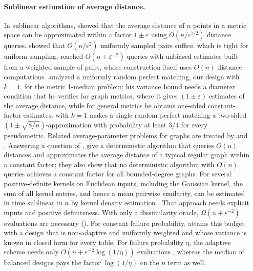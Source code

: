 \paragraph{Sublinear estimation of average distance.}
In sublinear algorithms, \citet{indyk1999sublinear} showed that the average
distance of $n$ points in a metric space can be approximated within a factor $1\pm\varepsilon$
using $O(n/\varepsilon^{7/2})$ distance queries.
\citet{barhum2007approximating} showed that $O(n/\varepsilon^2)$ uniformly
sampled pairs suffice, which is tight for uniform sampling.
\citet{chechik2015average} reached $O(n+\varepsilon^{-2})$ queries with unbiased
estimates built from a weighted sample of pairs, whose construction itself uses
$O(n)$ distance computations. \citet{chang2017metric} analyzed a uniformly
random perfect matching, our design with $k=1$, for the metric 1-median
problem; his variance bound needs a diameter condition
\citep[see also][]{chang2022random} that he verifies for graph metrics, where it gives $(1\pm\varepsilon)$ estimates of the average
distance, while for general metrics he obtains one-sided constant-factor
estimates.  with $k=1$ makes a single random perfect
matching a two-sided $(1\pm\sqrt{8/n})$-approximation with probability at
least $3/4$ for every pseudometric. Related average-parameter problems for graphs are
treated by \citet{feige2006sums} and \citet{goldreich2008approximating}. Answering a
question of \citet{mendel2015expanders}, \citet{eskenazis2026optimal} give a
deterministic algorithm that queries $O(n)$ distances and approximates the average
distance of a typical regular graph within a constant factor; they also show that no
deterministic algorithm with $O(n)$ queries achieves a constant factor for all
bounded-degree graphs. For several positive-definite kernels on
Euclidean inputs, including the Gaussian kernel, the sum of all kernel entries, and hence a mean pairwise
similarity, can be estimated in time sublinear in $n$ by kernel density
estimation \citep{backurs2021faster}. That approach needs explicit inputs and
positive definiteness. With only a dissimilarity oracle, $\Omega(n+\varepsilon^{-2})$
evaluations are necessary (). For constant failure
probability,  attains this budget with a design that is
non-adaptive and uniformly weighted and whose variance is known in closed
form for every table. For failure probability $\eta$, the adaptive scheme
needs only $O(n+\varepsilon^{-2}\log(1/\eta))$ evaluations
\citep[Theorem~1.3]{chechik2015average}, whereas the median of balanced
designs pays the factor $\log(1/\eta)$ on the $n$ term as well.


